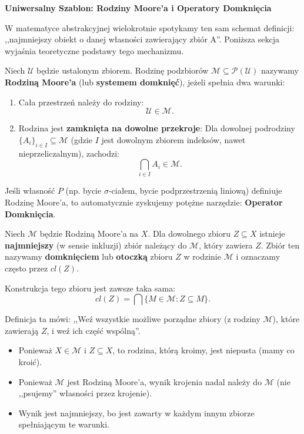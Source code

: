 \begin{contextline}
\textbf{Uniwersalny Szablon: Rodziny Moore’a i Operatory Domknięcia}

W matematyce abstrakcyjnej wielokrotnie spotykamy ten sam schemat definicji: ,,najmniejszy obiekt o danej własności zawierający zbiór A''. Poniższa sekcja wyjaśnia teoretyczne podstawy tego mechanizmu.

\begin{definition}
    Niech $\mathcal{U}$ będzie ustalonym zbiorem. Rodzinę podzbiorów $\mathcal{M} \subseteq \mathcal{P}(\mathcal{U})$ nazywamy \textbf{Rodziną Moore’a} (lub \textbf{systemem domknięć}), jeżeli spełnia dwa warunki:
    \begin{enumerate}
        \item Cała przestrzeń należy do rodziny:
		\[
		 \mathcal{U} \in \mathcal{M}
		.\] 
        \item Rodzina jest \textbf{zamknięta na dowolne przekroje}:
        Dla dowolnej podrodziny $\{A_i\}_{i \in I} \subseteq \mathcal{M}$ (gdzie $I$ jest dowolnym zbiorem indeksów, nawet nieprzeliczalnym), zachodzi:
        \[
            \bigcap_{i \in I} A_i \in \mathcal{M}.
        \]
    \end{enumerate}
\end{definition}

Jeśli własność $P$ (np. bycie $\sigma$-ciałem, bycie podprzestrzenią liniową) definiuje Rodzinę Moore'a, to automatycznie zyskujemy potężne narzędzie: \textbf{Operator Domknięcia}.

\begin{theorem}
    Niech $\mathcal{M}$ będzie Rodziną Moore'a na $X$. Dla dowolnego zbioru $Z \subseteq X$ istnieje \textbf{najmniejszy} (w sensie inkluzji) zbiór należący do $\mathcal{M}$, który zawiera $Z$.
    Zbiór ten nazywamy \textbf{domknięciem} lub \textbf{otoczką} zbioru $Z$ w rodzinie $\mathcal{M}$ i oznaczamy często przez $cl(Z)$.
    
    Konstrukcja tego zbioru jest zawsze taka sama:
    \[
        cl(Z) = \bigcap \big\{ M \in \mathcal{M} : Z \subseteq M \big\}.
    \]
\end{theorem}

\begin{remark}
    Definicja ta mówi: ,,Weź wszystkie możliwe porządne zbiory (z rodziny $\mathcal{M}$), które zawierają $Z$, i weź ich część wspólną''.
    \begin{itemize}
        \item Ponieważ $X \in \mathcal{M}$ i $Z \subseteq X$, to rodzina, którą kroimy, jest niepusta (mamy co kroić).
        \item Ponieważ $\mathcal{M}$ jest Rodziną Moore'a, wynik krojenia nadal należy do $\mathcal{M}$ (nie ,,psujemy'' własności przez krojenie).
        \item Wynik jest najmniejszy, bo jest zawarty w każdym innym zbiorze spełniającym te warunki.
    \end{itemize}
\end{remark}


\end{contextline}

